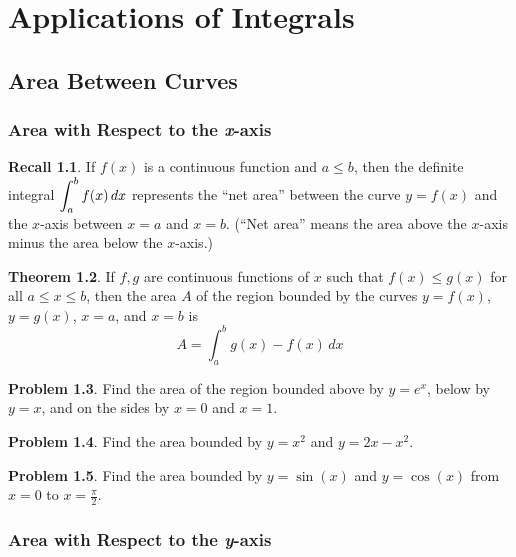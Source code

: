 \documentclass[letterpaper, twoside, 12pt]{book}
\theoremstyle{definition}
\newtheorem{theorem}{Theorem}
\newtheorem{recall}[theorem]{Recall}
\theoremstyle{definition}
\newtheorem{problem}[theorem]{Problem}
\newcommand{\ds}{\ensuremath{\displaystyle}}
\begin{document}
\setcounter{chapter}{5}

\chapter{Applications of Integrals}

\section{Area Between Curves}

\subsection{Area with Respect to the \emph{x}-axis}

\begin{recall}
  If $f(x)$ is a continuous function and $a\leq b$, then
  the definite integral $\ds\int_a^b f(x)\,dx$ represents the ``net area''
  between the curve $y=f(x)$ and the $x$-axis between $x=a$ and $x=b$.
  (``Net area'' means the area above the $x$-axis minus the area below
  the $x$-axis.)
\end{recall}

\begin{theorem}
  If $f,g$ are continuous functions of $x$ such that $f(x)\leq g(x)$ for all
  $a\leq x\leq b$, then the area $A$ of the region bounded by the curves
  $y = f(x)$, $y = g(x)$, $x = a$, and $x = b$ is
  \[
    A = \int_a^b g(x) - f(x) \, dx
  \]
\end{theorem}

\begin{problem}
 Find the area of the region bounded above by $y = e^x$, below by $y = x$,
 and on the sides by $x = 0$ and $x = 1$.
\end{problem}

\newpage

\begin{problem}
 Find the area bounded by $y = x^2$ and $y = 2x-x^2$.
\end{problem}

\vfill

\begin{problem}
 Find the area bounded by $y = \sin(x)$ and $y = \cos(x)$ from $x = 0$ to
 $x = \frac{\pi}{2}$.
\end{problem}

\vfill

\newpage

\subsection{Area with Respect to the \emph{y}-axis}
\end{document}
